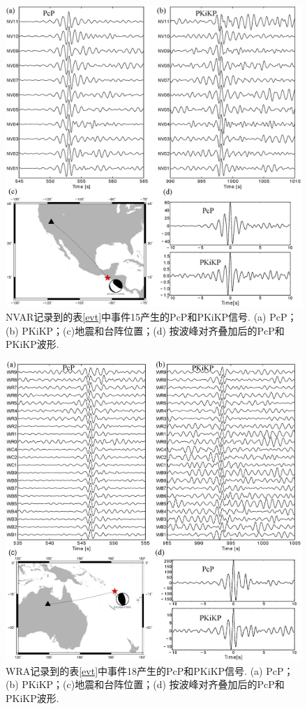 \begin{figure}
\centering
\includegraphics[width=1\linewidth]{fig/chap2/4371355_nvar}
\caption{NVAR记录到的表\ref{evt}中事件15产生的PcP和PKiKP信号. (a) PcP；(b) PKiKP；(c)地震和台阵位置；(d) 按波峰对齐叠加后的PcP和PKiKP波形. }
\label{fig:4371355_nvar}
\end{figure}

\begin{figure}
\centering
\includegraphics[width=1\linewidth]{fig/chap2/2844731_wra}
\caption{WRA记录到的表\ref{evt}中事件18产生的PcP和PKiKP信号. (a) PcP；(b) PKiKP；(c)地震和台阵位置；(d) 按波峰对齐叠加后的PcP和PKiKP波形. }
\label{fig:2844731_wra}
\end{figure}


